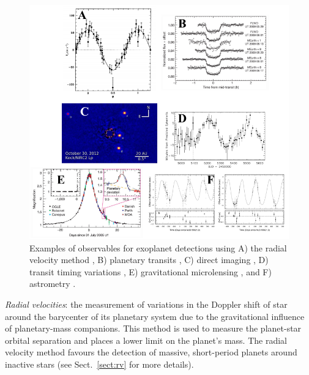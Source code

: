 \begin{figure}
  \centering
  \includegraphics[width=\textwidth]{figures/detection_methods.png}
  \caption[Methods of exoplanet detection and characterization.]
      {Examples of observables for exoplanet detections using A)
    the radial velocity method \citep{mayor95}, B) planetary transits
    \citep{charbonneau09}, C) direct imaging \citep{currie14},
    D) transit timing variations \citep{ballard11},
    E) gravitational microlensing \citep{beaulieu06}, and
    F) astrometry \citep{sahlmann13}.}
  \label{fig:detection}
\end{figure}

\emph{Radial velocities}: the measurement of variations in the Doppler shift of star
around the barycenter of its planetary system due to the gravitational influence of
planetary-mass companions. This method is used to measure the planet-star orbital separation
and places a lower limit on the planet's mass. The radial velocity
method favours the detection of massive, short-period planets around inactive stars
(see Sect.~\ref{sect:rv} for more details). \\

